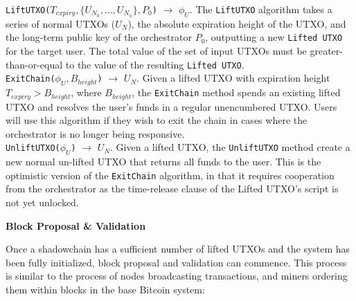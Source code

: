 \documentclass[10pt,a4paper]{article}
\theoremstyle{definition}
\begin{document}
\texttt{LiftUTXO($T_{expiry}, \{U_{N_0}, \ldots, U_{N_n}\}, P_{0}$)}
$\rightarrow$ $\phi_{U}$. The \texttt{LiftUTXO} algorithm takes a series of
normal UTXOs ($U_N$), the absolute expiration height of the UTXO, and the
long-term public key of the orchestrator $P_{0}$, outputting a new
\texttt{Lifted UTXO} for the target user. The total value of the set of input
UTXOs must be greater-than-or-equal to the value of the resulting
\texttt{Lifted UTXO}. \\

\texttt{ExitChain($\phi_{U}, B_{height}$)} $\rightarrow$ $U_{N}$. Given a
lifted UTXO with expiration height $T_{expiry} > B_{height}$, where
$B_{height}$, the \texttt{ExitChain} method spends an existing lifted UTXO and
resolves the user's funds in a regular unencumbered UTXO. Users will use this
algorithm if they wish to exit the chain in cases where the orchestrator is no
longer being responsive. \\

\texttt{UnliftUTXO($\phi_{U}$)} $\rightarrow$ $U_{N}$. Given a lifted UTXO, the
\texttt{UnliftUTXO} method create a new normal un-lifted UTXO that returns all
funds to the user. This is the optimistic version of the \texttt{ExitChain}
algorithm, in that it requires cooperation from the orchestrator as the
time-release clause of the Lifted UTXO's script is not yet unlocked.


\begin{center}
    \textbf{Block Proposal \& Validation}
\end{center}

Once a shadowchain has a sufficient number of lifted UTXOs and the system has
been fully initialized, block proposal and validation can commence. This
process is similar to the process of nodes broadcasting transactions, and
miners ordering them within blocks in the base Bitcoin system: \\
\end{document}
